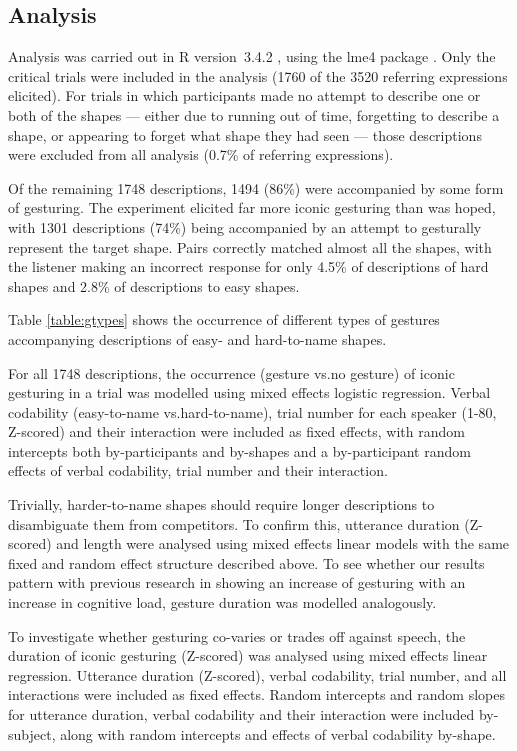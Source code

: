 \documentclass[a4paper,man,natbib]{apa6}
\begin{document}
\subsection{Analysis}
Analysis was carried out in R version~3.4.2 \citep{rbase}, using the lme4 package \citep{lme4}.
Only the critical trials were included in the analysis (1760 of the 3520 referring expressions elicited).
For trials in which participants made no attempt to describe one or both of the shapes --- either due to running out of time, forgetting to describe a shape, or appearing to forget what shape they had seen --- those descriptions were excluded from all analysis (0.7\% of referring expressions).

Of the remaining 1748 descriptions, 1494 (86\%) were accompanied by some form of gesturing. 
The experiment elicited far more iconic gesturing than was hoped, with 1301 descriptions (74\%) being accompanied by an attempt to gesturally represent the target shape.
Pairs correctly matched almost all the shapes, with the listener making an incorrect response for only 4.5\% of descriptions of hard shapes and 2.8\% of descriptions to easy shapes.


Table \ref{table:gtypes} shows the occurrence of different types of gestures accompanying descriptions of easy- and hard-to-name shapes.

For all 1748 descriptions, the occurrence (gesture vs.\@ no gesture) of iconic gesturing in a trial was modelled using mixed effects logistic regression. 
Verbal codability (easy-to-name vs.\@ hard-to-name), trial number for each speaker (1-80, Z-scored) and their interaction were included as fixed effects, with random intercepts both by-participants and by-shapes and a by-participant random effects of verbal codability, trial number and their interaction.


Trivially, harder-to-name shapes should require longer descriptions to disambiguate them from competitors. 
To confirm this, utterance duration (Z-scored) and length were analysed using mixed effects linear models with the same fixed and random effect structure described above.
To see whether our results pattern with previous research in showing an increase of gesturing with an increase in cognitive load, gesture duration was modelled analogously.

To investigate whether gesturing co-varies or trades off against speech, the duration of iconic gesturing (Z-scored) was analysed using mixed effects linear regression.
Utterance duration (Z-scored), verbal codability, trial number, and all interactions were included as fixed effects. 
Random intercepts and random slopes for utterance duration, verbal codability and their interaction were included by-subject, along with random intercepts and effects of verbal codability by-shape.
\end{document}
